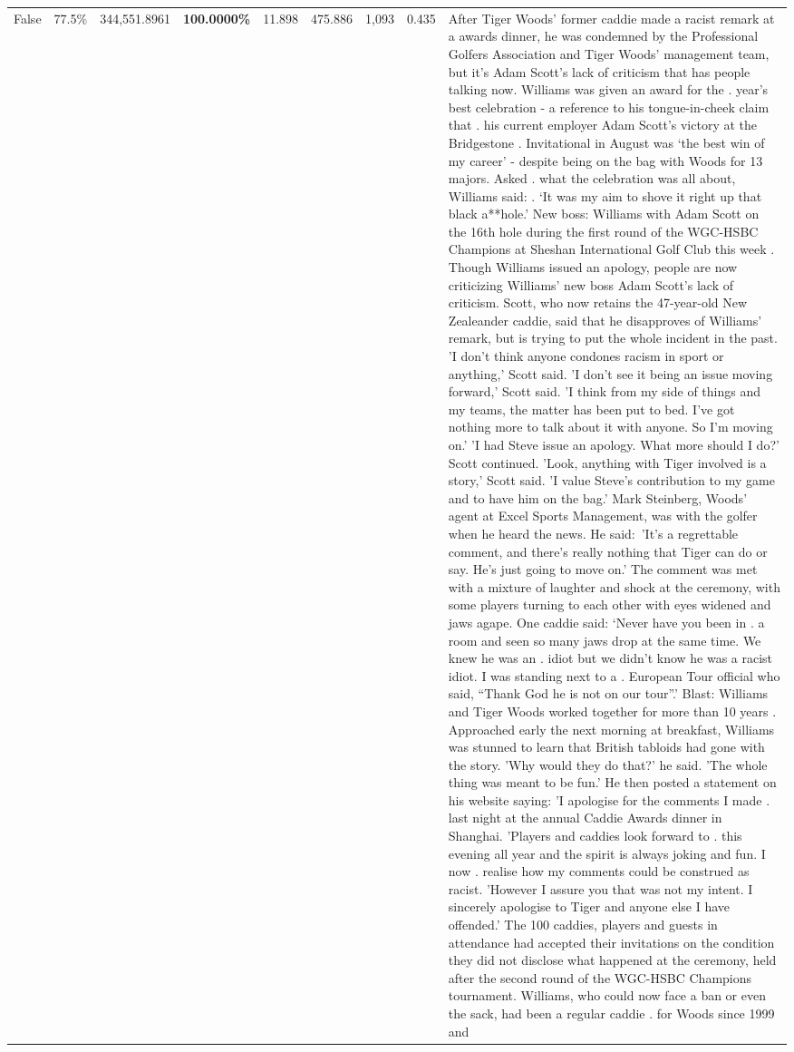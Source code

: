 \begin{table}[H]
\begin{tabular}{lllrlllll}
False & 77.5\% & 344,551.8961 & \bfseries \color{red} 100.0000\% & 11.898 & 475.886 & 1,093 & 0.435 & After Tiger Woods' former caddie made a racist remark at a awards dinner, he was condemned by the Professional Golfers Association and Tiger Woods' management team, but it's Adam Scott's lack of criticism that has people talking now. Williams was given an award for the . year’s best celebration - a reference to his tongue-in-cheek claim that . his current employer Adam Scott’s victory at the Bridgestone . Invitational in August was ‘the best win of my career’ - despite being on the bag with Woods for 13 majors. Asked . what the celebration was all about, Williams said: . ‘It was my aim to shove it right up that black a**hole.’ New boss: Williams with Adam Scott  on the 16th hole during the first round of the WGC-HSBC Champions at Sheshan International Golf Club this week . Though Williams issued an apology, people are now criticizing Williams' new boss Adam Scott's lack of criticism. Scott, who now retains the 47-year-old New Zealeander caddie, said that he disapproves of Williams' remark, but is trying to put the whole incident in the past. 'I don't think anyone condones racism in sport or anything,' Scott said. 'I don't see it being an issue moving forward,' Scott said. 'I think from my side of things and my teams, the matter has been put to bed. I've got nothing more to talk about it with anyone. So I'm moving on.' 'I had Steve issue an apology. What more should I do?' Scott continued. 'Look, anything with Tiger involved is a story,' Scott said. 'I value Steve's contribution to my game and to have him on the bag.' Mark Steinberg, Woods' agent at Excel Sports Management, was with the golfer when he heard the news. He said: 'It's a regrettable comment, and there's really nothing that Tiger can do or say. He's just going to move on.' The comment was met with a mixture of laughter and shock at the ceremony, with some players turning to each other with eyes widened and jaws agape. One caddie said: ‘Never have you been in . a room and seen so many jaws drop at the same time. We knew he was an . idiot but we didn’t know he was a racist idiot. I was standing next to a . European Tour official who said, “Thank God he is not on our tour”.’ Blast: Williams and Tiger Woods worked together for more than 10 years . Approached early the next morning at breakfast, Williams was stunned to learn that British tabloids had gone with the story. 'Why would they do that?' he said. 'The whole thing was meant to be fun.' He then posted a statement on his website saying: 'I apologise for the comments I made . last night at the annual Caddie Awards dinner in Shanghai. 'Players and caddies look forward to . this evening all year and the spirit is always joking and fun. I now . realise how my comments could be construed as racist. 'However I assure you that was not my intent. I sincerely apologise to Tiger and anyone else I have offended.' The 100 caddies, players and guests in attendance had accepted their invitations on the condition they did not disclose what happened at the ceremony, held after the second round of the WGC-HSBC Champions tournament. Williams, who could now face a ban or even the sack, had been a regular caddie . for Woods since 1999 and 
\end{tabular}
\end{table}
